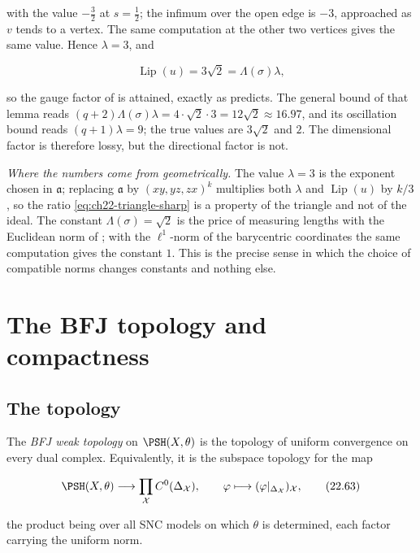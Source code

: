 \begin{example}
with the value $-\tfrac32$ at $s=\tfrac12$; the infimum over the open
edge is $-3$, approached as $v$ tends to a vertex.  The same computation
at the other two vertices gives the same value.  Hence
$\lambda=3$, and

\[
 \operatorname{Lip}(u)=3\sqrt2=\Lambda(\sigma)\lambda ,
\tag{22.62}\label{eq:ch22-triangle-sharp}
\]

so the gauge factor of  is attained, exactly as
 predicts.  The general bound of that lemma
reads $(q+2)\Lambda(\sigma)\lambda=4\cdot\sqrt2\cdot3=12\sqrt2\approx16.97$,
and its oscillation bound reads $(q+1)\lambda=9$; the true values are
$3\sqrt2$ and $2$.  The dimensional factor is therefore lossy, but the
directional factor is not.

\emph{Where the numbers come from geometrically.}  The value $\lambda=3$
is the exponent chosen in $\mathfrak a$; replacing
$\mathfrak a$ by $(xy,yz,zx)^k$ multiplies both $\lambda$ and
$\operatorname{Lip}(u)$ by $k/3$, so the ratio
\eqref{eq:ch22-triangle-sharp} is a property of the triangle and not of the
ideal.  The constant $\Lambda(\sigma)=\sqrt2$ is the price of measuring
lengths with the Euclidean norm of
; with the $\ell^1$-norm of the barycentric
coordinates the same computation gives the constant $1$.  This is the
precise sense in which the choice of compatible norms changes constants and
nothing else.
\end{example}

\section{The BFJ topology and compactness}
\label{sec:ch22-topology}

\subsection{The topology}

\begin{definition}\label{def:ch22-bfj-topology}
The \emph{BFJ weak topology} on $\PSH(X,\theta)$ is the topology of uniform
convergence on every dual complex.  Equivalently, it is the subspace
topology for the map

\[
 \PSH(X,\theta)\longrightarrow
 \prod_{\mathcal X}C^0(\Delta_{\mathcal X}),
 \qquad
 \varphi\longmapsto
       (\varphi|_{\Delta_{\mathcal X}})_{\mathcal X},
\tag{22.63}\label{eq:ch22-product-embedding}
\]

the product being over all SNC models on which $\theta$ is determined,
each factor carrying the uniform norm.
\end{definition}

